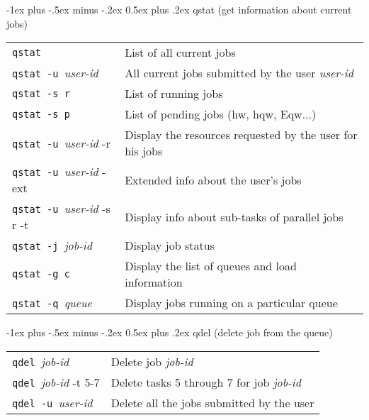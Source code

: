 \documentclass[10pt,landscape]{article}
\makeatletter
\renewcommand{\section}{\@startsection{section}{1}{0mm}%
                                {-1ex plus -.5ex minus -.2ex}%
                                {0.5ex plus .2ex}%
                                {\normalfont\large\bfseries}}
\makeatother
\begin{document}
\begin{multicols*}{2}
\section{qstat (get information about current jobs)}
\begin{tabular}{@{}ll@{}}
\verb!qstat!   & List of all current jobs \\
\verb!qstat -u !\textit{user-id}   & All current jobs submitted by the user \textit{user-id}\\
\verb!qstat -s r! & List of running jobs \\
\verb!qstat -s p!  & List of pending jobs (hw, hqw, Eqw...)\\
\verb!qstat -u !\textit{user-id} -r  & Display the resources requested by the user for his jobs\\
\verb!qstat -u !\textit{user-id} -ext  & Extended info about the user's jobs\\
\verb!qstat -u !\textit{user-id} -s r -t  & Display info about sub-tasks of parallel jobs\\
\verb!qstat -j !\textit{job-id}  & Display job status\\
\verb!qstat -g c!  & Display the list of queues and load information\\
\verb!qstat -q !\textit{queue}   & Display jobs running on a particular queue\\
\end{tabular}

\vspace{10pt}

\section{qdel (delete job from the queue) }
\begin{tabular}{@{}ll@{}}
\verb!qdel !\textit{job-id}   & Delete job \textit{job-id} \\
\verb!qdel !\textit{job-id} -t 5-7   & Delete tasks 5 through 7 for job \textit{job-id} \\
\verb!qdel -u !\textit{user-id}   & Delete all the jobs submitted by the user\\
\end{tabular}




\end{multicols*}
\end{document}
